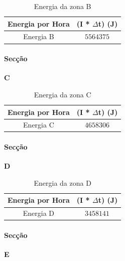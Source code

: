\documentclass[12pt, a4paper]{article}
\begin{document}
\begin{table}[htpb]
	\begin{center}
		\begin{tabular}{c c}
			\toprule
			Energia por Hora 								 & 	(I * $\Delta$t) (J) \\
			\midrule
			Energia B						               	     & $5564375$	 \\
			\bottomrule
		\end{tabular}
	\end{center}
	\caption{Energia da zona B}\label{tab:2seccaoBpotT28}
\end{table}

\vspace{30mm}

\paragraph{Secção}
\textbf{C}

\begin{table}[htpb]
	\begin{center}
		\begin{tabular}{c c}
			\toprule
			Energia por Hora 								 & 	(I * $\Delta$t) (J)  \\
			\midrule
			Energia C 						               	     & $4658306$	 \\
			\bottomrule
		\end{tabular}
	\end{center}
	\caption{Energia da zona C}\label{tab:4seccaoCpotT28}
\end{table}

\pagebreak
\paragraph{Secção}
\textbf{D}

\begin{table}[htpb]
	\begin{center}
		\begin{tabular}{c c}
			\toprule
			Energia por Hora 								 & 	(I * $\Delta$t) (J)  \\
			\midrule
			Energia D 						               	     & $3458141$	 \\
			\bottomrule
		\end{tabular}
	\end{center}
	\caption{Energia da zona D}\label{tab:5seccaoDpotT28}
\end{table}

\paragraph{Secção}
\textbf{E}
\end{document}
